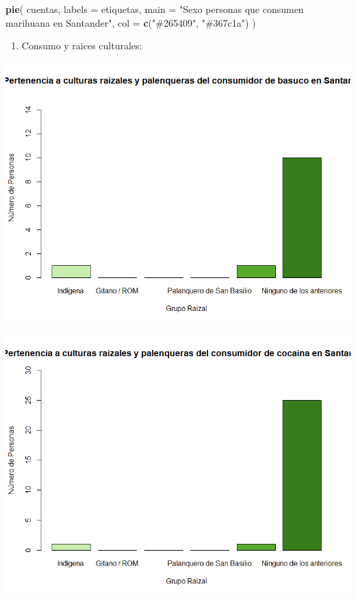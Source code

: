 \documentclass[
]{article}
\newenvironment{Shaded}{\begin{snugshade}}{\end{snugshade}}
\newcommand{\AttributeTok}[1]{\textcolor[rgb]{0.13,0.29,0.53}{#1}}
\newcommand{\FunctionTok}[1]{\textcolor[rgb]{0.13,0.29,0.53}{\textbf{#1}}}
\newcommand{\NormalTok}[1]{#1}
\newcommand{\StringTok}[1]{\textcolor[rgb]{0.31,0.60,0.02}{#1}}
\providecommand{\tightlist}{%
  \setlength{\itemsep}{0pt}\setlength{\parskip}{0pt}}
\begin{document}
\begin{Shaded}
\begin{Highlighting}[]
\FunctionTok{pie}\NormalTok{(}
\NormalTok{  cuentas,}
  \AttributeTok{labels =}\NormalTok{ etiquetas,}
  \AttributeTok{main =} \StringTok{"Sexo personas que consumen marihuana en Santander"}\NormalTok{,}
  \AttributeTok{col =} \FunctionTok{c}\NormalTok{(}\StringTok{"\#265409"}\NormalTok{, }\StringTok{"\#367c1a"}\NormalTok{)}
\NormalTok{)}
\end{Highlighting}
\end{Shaded}

\begin{enumerate}
\def\labelenumi{\arabic{enumi}.}
\setcounter{enumi}{4}
\tightlist
\item
  Consumo y raices culturales:
\end{enumerate}

\includegraphics{images/basuco cultura santander.png}

\includegraphics{images/cocaina cultura santander.png}
\end{document}
